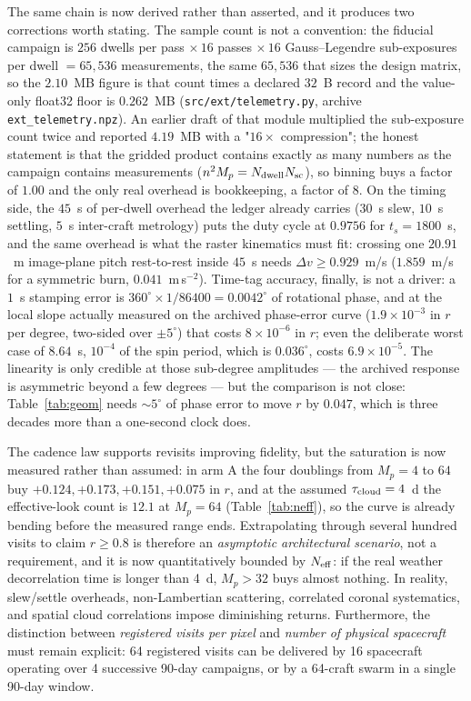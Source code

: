 \documentclass[twocolumn,10pt]{article}
\begin{document}
The same chain is now derived rather than asserted, and it produces two
corrections worth stating. The sample count is not a convention: the fiducial
campaign is $256$ dwells per pass $\times\,16$ passes $\times\,16$
Gauss--Legendre sub-exposures per dwell $=65{,}536$ measurements, the same
$65{,}536$ that sizes the design matrix, so the $2.10$~MB figure is that count
times a declared $32$~B record and the value-only float32 floor is $0.262$~MB
({\tt src/ext/telemetry.py}, archive {\tt ext\_telemetry.npz}). An earlier
draft of that module multiplied the sub-exposure count twice and reported
$4.19$~MB with a "$16\times$ compression"; the honest statement is that the
gridded product contains exactly as many numbers as the campaign contains
measurements ($n^2M_p = N_{\rm dwell}N_{\rm sc}$), so binning buys a factor of
$1.00$ and the only real overhead is bookkeeping, a factor of $8$. On the
timing side, the $45$~s of per-dwell overhead the ledger already carries
($30$~s slew, $10$~s settling, $5$~s inter-craft metrology) puts the duty cycle
at $0.9756$ for $t_s=1800$~s, and the same overhead is what the raster
kinematics must fit: crossing one $20.91$~m image-plane pitch rest-to-rest
inside $45$~s needs $\Delta v \ge 0.929$~m/s ($1.859$~m/s for a symmetric
burn, $0.041$~m\,s$^{-2}$). Time-tag accuracy, finally, is not a driver: a
$1$~s stamping error is $360^\circ\times1/86400 = 0.0042^\circ$ of rotational
phase, and at the local slope actually measured on the archived phase-error
curve ($1.9\times10^{-3}$ in $r$ per degree, two-sided over $\pm5^\circ$) that
costs $8\times10^{-6}$ in $r$; even the deliberate worst case of $8.64$~s,
$10^{-4}$ of the spin period, which is $0.036^\circ$, costs $6.9\times10^{-5}$. The
linearity is only credible at those sub-degree amplitudes --- the archived
response is asymmetric beyond a few degrees --- but the comparison is not
close: Table~\ref{tab:geom} needs $\sim5^\circ$ of phase error to move $r$ by
$0.047$, which is three decades more than a one-second clock does.

 The cadence law
supports revisits improving fidelity, but the saturation is now measured rather
than assumed: in arm A the four doublings from $M_p=4$ to $64$ buy
$+0.124,+0.173,+0.151,+0.075$ in $r$, and at the assumed
$\tau_{\rm cloud}=4$~d the effective-look count is $12.1$ at $M_p=64$
(Table~\ref{tab:neff}), so the curve is already bending before the measured
range ends. Extrapolating through several hundred visits to claim
$r\ge0.8$ is therefore an {\it asymptotic architectural scenario}, not a
requirement, and it is now quantitatively bounded by $N_{\rm eff}$: if the real
weather decorrelation time is longer than 4~d, $M_p>32$ buys almost nothing.
In reality, slew/settle overheads, non-Lambertian scattering, correlated
coronal systematics, and spatial cloud correlations impose diminishing returns.
Furthermore, the distinction between {\it registered visits per pixel} and
{\it number of physical spacecraft} must remain explicit: 64 registered visits
can be delivered by 16 spacecraft operating over 4 successive 90-day campaigns,
or by a 64-craft swarm in a single 90-day window.
\end{document}
